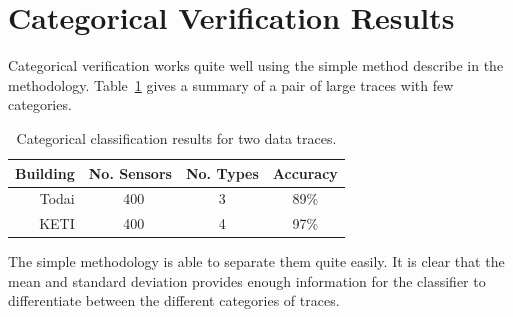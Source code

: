 \section{Categorical Verification Results}

Categorical verification works quite well using the simple method describe in the methodology.  Table~\ref{tab:type_class}
gives a summary of a pair of large traces with few categories.

\begin{table}[h]
\begin{center}
\begin{tabular}{| r | c | c | c |}
	\hline
	\textbf{Building} & \textbf{No. Sensors} & \textbf{No. Types} & \textbf{Accuracy}\\ \hline
	Todai & ~400 & 3 & 89\%    \\ \hline

	KETI & ~400 & 4 & 97\% 	 	\\ \hline

\end{tabular}
\caption{Categorical classification results for two data traces.}
\label{tab:type_class}
\end{center}
\end{table}

The simple methodology is able to separate them quite easily.  It is clear that the mean and standard deviation provides enough
information for the classifier to differentiate between the different categories of traces.





